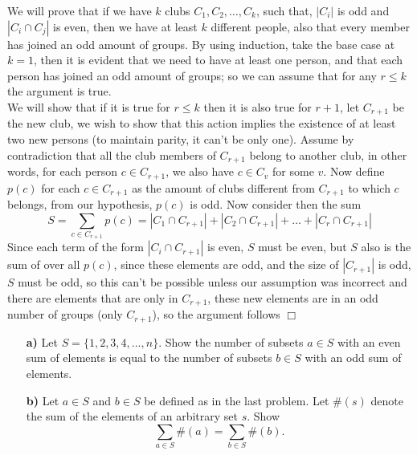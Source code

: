 \begin{solution}
    We will prove that if we have $k$ clubs $C_1, C_2, \ldots, C_k$, such that, $|C_i|$ is odd and $|C_i \cap C_j|$ is even, then we have at least $k$ different people, also that every member has joined an odd amount of groups. By using induction, take the base case at $k=1$, then it is evident that we need to have at least one person, and that each person has joined an odd amount of groups; so we can assume that for any $r \leq k$ the argument is true. \\
    We will show that if it is true for $r \leq k$ then it is also true for $r+1$, let $C_{r+1}$ be the new club, we wish to show that this action implies the existence of at least two new persons (to maintain parity, it can't be only one). Assume by contradiction that all the club members of $C_{r+1}$ belong to another club, in other words, for each person $c \in C_{r+1}$, we also have $c \in C_v$ for some $v$. Now define $p(c)$ for each $c \in C_{r+1}$ as the amount of clubs different from $C_{r+1}$ to which $c$ belongs, from our hypothesis, $p(c)$ is odd. Now consider then the sum
    $$S = \sum_{c \in C_{r+1}} p(c) =|C_1 \cap C_{r+1}| + |C_2 \cap C_{r+1}| + \ldots + |C_r \cap C_{r+1}|$$
    Since each term of the form $|C_i \cap C_{r+1}|$ is even, $S$ must be even, but $S$ also is the sum of over all $p(c)$, since these elements are odd, and the size of $|C_{r+1}|$ is odd, $S$ must be odd, so this can't be possible unless our assumption was incorrect and there are elements that are only in $C_{r+1}$, these new elements are in an odd number of groups (only $C_{r+1}$), so the argument follows $\Box$
\end{solution}

\begin{problem}[C][9][Folklore]
\begin{enumerate} 
\item[\textbf{a)}] Let $S = \{1, 2, 3, 4, \dots, n\}$. Show the number of subsets $a \in S$ with an even sum of elements is equal to the number of subsets $b \in S$
with an odd sum of elements. 
\item[\textbf{b)}] Let $a \in S$ and $b \in S$ be defined as in the last problem. Let $\#(s)$ denote the sum of the elements of an arbitrary set $s$. Show \[\sum_{a \in S} \#(a) = \sum_{b \in S} \#(b).\]
\end{enumerate}
\end{problem}


